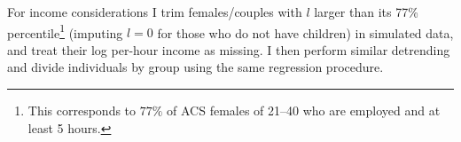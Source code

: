 \documentclass[12pt,letter]{article}
\begin{document}

%
For income considerations I trim females/couples with $l$ larger than its 77\% percentile\footnote{This corresponds to $77\%$ of ACS females of 21--40 who are employed and at least 5 hours.} (imputing $l = 0$ for those who do not have children) in simulated data, and treat their log per-hour income as missing. I then perform similar detrending and divide individuals by group using the same regression procedure.
\end{document}
